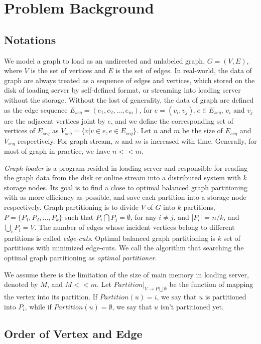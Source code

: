 \documentclass{sig-alternate-2013}
\begin{document}
\section{Problem Background}\label{section-background}
\subsection{Notations}

We model a graph to load as an undirected and unlabeled graph,  $G=(V,E)$, where $V$ is the set of vertices and $E$ is the set of edges. In real-world, the data of graph are always treated as a sequence of edges and vertices, which stored on the disk of loading server by self-defined format, or streaming into loading server without the storage. Without the lost of generality, the data of graph are defined as the edge sequence $E_{seq}=(e_1,e_2,...,e_m)$, for $e=(v_i, v_j), e \in E_{seq}$, $v_i$ and $v_j$ are the adjacent vertices joint by $e$, and we define the corresponding set of vertices of $E_{seq}$ as $V_{seq} = \{v | v\in e , e\in E_{seq}\}$. Let $n$ and $m$ be the size of $E_{seq}$ and $V_{seq}$ respectively. For graph stream, $n$ and $m$ is increased with time. Generally, for most of graph in practice, we have $n<<m$.

\textit{Graph loader} is a program resided in loading server and responsible for reading the graph data from the disk or online stream into a distributed system with $k$ storage nodes. Its goal is to find a close to optimal balanced graph partitioning with as more efficiency as possible, and save each partition into a storage node respectively. Graph partitioning is to divide $V$ of $G$ into $k$ partitions, $P=\{P_1, P_2, ... , P_k\}$ such that $P_i \bigcap P_j = \emptyset$, for any $i\neq j$, and |$P_i$| = $n/k$, and ${\bigcup}_i P_i = V$. The number of edges whose incident vertices belong to different partitions is called \textit{edge-cuts}. Optimal balanced graph partitioning is $k$ set of partitions with minimized edge-cuts. We call the algorithm that searching the optimal graph partitioning as \textit{optimal partitioner}.


We assume there is the limitation of the size of main memory in loading server, denoted by $M$, and $M<<m$.
Let $Partition |_{V\rightarrow P\bigcup \emptyset}$ be the function of mapping the vertex into its partition. If $Partition(u)=i$, we say that $u$ is partitioned into $P_i$, while if $Partition(u)=\emptyset$, we say that $u$ isn't partitioned yet.


\subsection{Order of Vertex and Edge}\label{section-edge-order}
\end{document}
